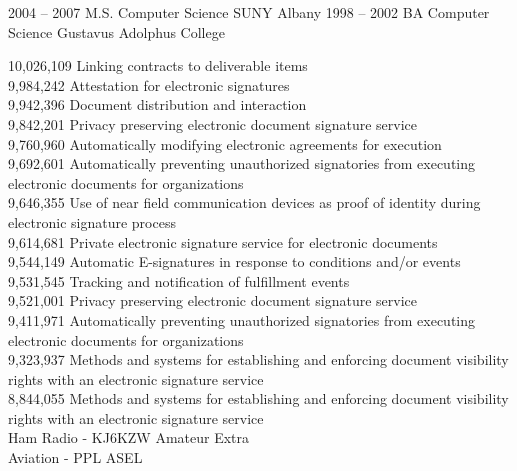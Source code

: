 \documentclass[9pt]{developercv} %
\begin{document}
\begin{entrylist}
	\entry
		{2004 -- 2007}
		{M.S. Computer Science}
	        {SUNY Albany}
                {}
	\entry
		{1998 -- 2002}
		{BA Computer Science}
	        {Gustavus Adolphus College}
                {}
\end{entrylist}


10,026,109	Linking contracts to deliverable items \\
9,984,242	Attestation for electronic signatures \\
9,942,396	Document distribution and interaction \\
9,842,201	Privacy preserving electronic document signature service \\
9,760,960	Automatically modifying electronic agreements for execution \\
9,692,601	Automatically preventing unauthorized signatories from executing electronic documents for organizations \\
9,646,355	Use of near field communication devices as proof of identity during electronic signature process \\
9,614,681	Private electronic signature service for electronic documents \\
9,544,149	Automatic E-signatures in response to conditions and/or events \\ 
9,531,545	Tracking and notification of fulfillment events \\
9,521,001	Privacy preserving electronic document signature service \\
9,411,971	Automatically preventing unauthorized signatories from executing electronic documents for organizations \\
9,323,937	Methods and systems for establishing and enforcing document visibility rights with an electronic signature service \\
8,844,055	Methods and systems for establishing and enforcing document visibility rights with an electronic signature service \\

Ham Radio - KJ6KZW Amateur Extra \\
Aviation - PPL ASEL \\


\end{document}
